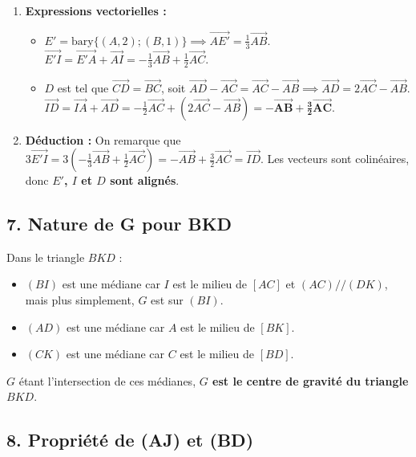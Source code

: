 \documentclass[12pt,a4paper]{article}
\begin{document}
\begin{enumerate}
    \item \textbf{Expressions vectorielles :}
    \begin{itemize}
        \item $E' = \text{bary}\{(A, 2); (B, 1)\} \implies \overrightarrow{AE'} = \frac{1}{3}\overrightarrow{AB}$.
        $\overrightarrow{E'I} = \overrightarrow{E'A} + \overrightarrow{AI} = -\frac{1}{3}\overrightarrow{AB} + \frac{1}{2}\overrightarrow{AC}$.
        \item $D$ est tel que $\overrightarrow{CD} = \overrightarrow{BC}$, soit $\overrightarrow{AD} - \overrightarrow{AC} = \overrightarrow{AC} - \overrightarrow{AB} \implies \overrightarrow{AD} = 2\overrightarrow{AC} - \overrightarrow{AB}$.
        $\overrightarrow{ID} = \overrightarrow{IA} + \overrightarrow{AD} = -\frac{1}{2}\overrightarrow{AC} + (2\overrightarrow{AC} - \overrightarrow{AB}) = \mathbf{-\overrightarrow{AB} + \frac{3}{2}\overrightarrow{AC}}$.
    \end{itemize}
    \item \textbf{Déduction :}
    On remarque que $3\overrightarrow{E'I} = 3(-\frac{1}{3}\overrightarrow{AB} + \frac{1}{2}\overrightarrow{AC}) = -\overrightarrow{AB} + \frac{3}{2}\overrightarrow{AC} = \overrightarrow{ID}$.
    Les vecteurs sont colinéaires, donc \textbf{$E'$, $I$ et $D$ sont alignés}.
\end{enumerate}

\subsection*{7. Nature de G pour BKD}

Dans le triangle $BKD$ :
\begin{itemize}
    \item $(BI)$ est une médiane car $I$ est le milieu de $[AC]$ et $(AC)//(DK)$, mais plus simplement, $G$ est sur $(BI)$.
    \item $(AD)$ est une médiane car $A$ est le milieu de $[BK]$.
    \item $(CK)$ est une médiane car $C$ est le milieu de $[BD]$.
\end{itemize}
$G$ étant l'intersection de ces médianes, \textbf{$G$ est le centre de gravité du triangle $BKD$}.

\subsection*{8. Propriété de (AJ) et (BD)}
\end{document}
